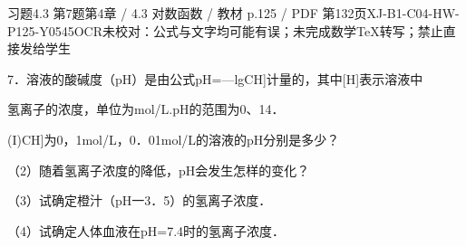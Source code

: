 \begin{bankitem}{习题4.3 第7题}{第4章 / 4.3 对数函数 / 教材 p.125 / PDF 第132页}{XJ-B1-C04-HW-P125-Y0545}{OCR未校对：公式与文字均可能有误；未完成数学TeX转写；禁止直接发给学生}
\begin{ocrdraft}
\par
7．溶液的酸碱度（pH）是由公式pH=—lgCH]计量的，其中[H]表示溶液中
\par
氢离子的浓度，单位为mol/L.pH的范围为0、14．
\par
(I)CH]为0，1mol/L，0．01mol/L的溶液的pH分别是多少？
\par
（2）随着氢离子浓度的降低，pH会发生怎样的变化？
\par
（3）试确定橙汁（pH一3．5）的氢离子浓度．
\par
（4）试确定人体血液在pH=7.4时的氢离子浓度．
\end{ocrdraft}
\end{bankitem}
